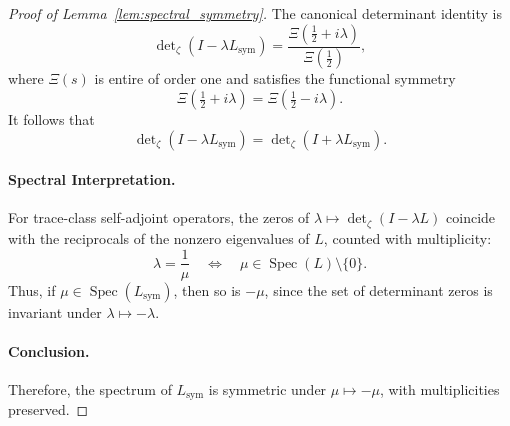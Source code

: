 \begin{proof}[Proof of Lemma~\ref{lem:spectral_symmetry}]
The canonical determinant identity is
\[
\det\nolimits_{\zeta}(I - \lambda L_{\mathrm{sym}}) = \frac{\Xi(\tfrac{1}{2} + i\lambda)}{\Xi(\tfrac{1}{2})},
\]
where \( \Xi(s) \) is entire of order one and satisfies the functional symmetry
\[
\Xi\left(\tfrac{1}{2} + i\lambda\right) = \Xi\left(\tfrac{1}{2} - i\lambda\right).
\]
It follows that
\[
\det\nolimits_{\zeta}(I - \lambda L_{\mathrm{sym}}) = \det\nolimits_{\zeta}(I + \lambda L_{\mathrm{sym}}).
\]

\paragraph{Spectral Interpretation.}
For trace-class self-adjoint operators, the zeros of \( \lambda \mapsto \det\nolimits_{\zeta}(I - \lambda L) \) coincide with the reciprocals of the nonzero eigenvalues of \( L \), counted with multiplicity:
\[
\lambda = \frac{1}{\mu} \quad \Longleftrightarrow \quad \mu \in \operatorname{Spec}(L) \setminus \{0\}.
\]
Thus, if \( \mu \in \operatorname{Spec}(L_{\mathrm{sym}}) \), then so is \( -\mu \), since the set of determinant zeros is invariant under \( \lambda \mapsto -\lambda \).

\paragraph{Conclusion.}
Therefore, the spectrum of \( L_{\mathrm{sym}} \) is symmetric under \( \mu \mapsto -\mu \), with multiplicities preserved.
\end{proof}
